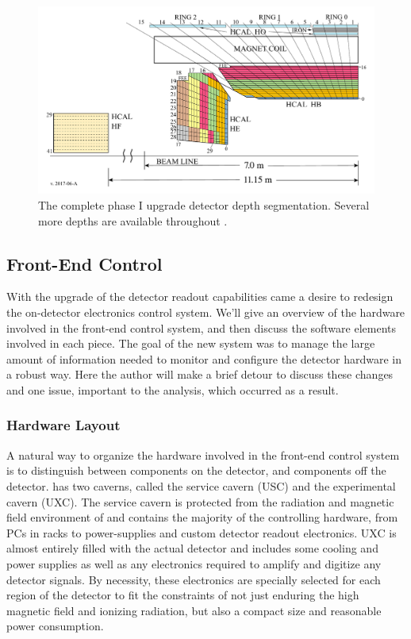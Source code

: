 \begin{figure}[!tp]
    \centering
    \includegraphics[width=\textwidth]{figures/HCAL-Depth-Segmentation-Phase1-HBHE-View-HBHEHFHO-v201706A.pdf}
    \caption[
       \HCAL phase I upgrade depth segmentation.
    ]{
       The complete phase I upgrade \HCAL detector depth segmentation.  Several more depths are available throughout \HCAL. 
    }
    \label{fig:HCALdepthsPhaseI}
\end{figure}

\subsection{Front-End Control}
With the upgrade of the \HCAL detector readout capabilities came a desire to redesign the on-detector electronics control system.  We'll give an overview of the hardware involved in the front-end control system, and then discuss the software elements involved in each piece. The goal of the new system was to manage the large amount of information needed to monitor and configure the detector hardware in a robust way.  Here the author will make a brief detour to discuss these changes and one issue, important to the analysis, which occurred as a result.
\subsubsection{Hardware Layout}
A natural way to organize the hardware involved in the \HCAL front-end control system is to distinguish between components on the detector, and components off the detector.  \CMS has two caverns, called the service cavern (USC) and the experimental cavern (UXC).  The service cavern is protected from the radiation and magnetic field environment of \CMS and contains the majority of the controlling hardware, from PCs in racks to power-supplies and custom detector readout electronics.  UXC is almost entirely filled with the actual \CMS detector and includes some cooling and power supplies as well as any electronics required to amplify and digitize any detector signals.  By necessity, these electronics are specially selected for each region of the detector to fit the constraints of not just enduring the high magnetic field and ionizing radiation, but also a compact size and reasonable power consumption.

